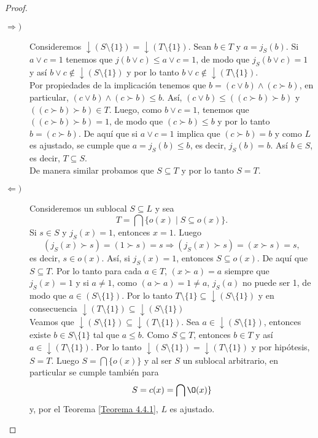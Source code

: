\documentclass{comunicaciones}
\begin{document}
\begin{proof}
\begin{description}
    \item[$\Rightarrow) $] Consideremos $\downarrow(S\setminus \{1\})=\downarrow(T\setminus \{1\})$. Sean $b\in T$ y $a=j_S(b)$. Si $a\vee c=1$ tenemos que $j(b\vee c)\leq a\vee c=1$, de modo que $j_S(b\vee c)=1$ y así $b\vee c\notin \downarrow(S\setminus \{1\})$ y por lo tanto $b\vee c\notin \downarrow (T\setminus \{1\})$.\\

    Por propiedades de la implicación tenemos que $b=(c\vee b)\wedge (c\succ b)$, en particular, $(c\vee b)\wedge (c\succ b)\leq b$. Así, $(c\vee b)\leq ((c\succ b)\succ b)$ y $((c\succ b)\succ b)\in T$. Luego, como $b\vee c=1$, tenemos que $((c\succ b)\succ b)=1$, de modo que $(c\succ b)\leq b$ y por lo tanto $b=(c\succ b)$. De aquí que si $a\vee c=1$ implica que $(c\succ b)=b$ y como $L$ es ajustado, se cumple que $a=j_S(b)\leq b$, es decir, $j_S(b)=b$. Así $b\in S$, es decir, $T\subseteq S$.\\

    De manera similar probamos que $S\subseteq T$ y por lo tanto $S=T$.

    \item[$\Leftarrow) $] Consideremos un sublocal $S\subseteq L$ y sea 
    \[
    T=\bigcap\{o(x)\mid S\subseteq o(x)\}.
    \]
    Si $s\in S$ y $j_S(x)=1$, entonces $x=1$. Luego
    \[
    (j_S(x)\succ s)=(1\succ s)=s\Rightarrow (j_S(x)\succ s)=(x\succ s)=s,
    \]
    es decir, $s\in o(x)$. Así, si $j_S(x)=1$, entonces $S\subseteq o(x)$. De aquí que $S\subseteq T$. Por lo tanto para cada $a\in T$, $(x\succ a)=a$ siempre que $j_S(x)=1$ y si $a\neq 1$, como $(a\succ a)=1\neq a$, $j_S(a)$ no puede ser 1, de modo que $a\in (S\setminus \{1\})$. Por lo tanto $T\setminus\{1\}\subseteq \downarrow (S\setminus \{1\})$ y en consecuencia $\downarrow(T\setminus \{1\})\subseteq \downarrow(S\setminus \{1\})$\\

    Veamos que $\downarrow (S\setminus \{1\})\subseteq \downarrow(T\setminus \{1\})$. Sea $a\in \downarrow(S\setminus \{1\})$, entonces existe $b\in S\setminus \{1\}$ tal que $a\leq b$. Como $S\subseteq T$, entonces $b\in T$ y así $a\in \downarrow(T\setminus \{1\})$. Por lo tanto $\downarrow(S\setminus \{1\})=\downarrow(T\setminus \{1\})$ y por hipótesis, $S=T$. Luego $S=\bigcap \{o(x)\}$ y al ser $S$ un sublocal arbitrario, en particular se cumple también para 
    \[
    S=c(x)=\bigcap\o(x)\}
    \]
    y, por el Teorema \ref{Teorema 4.4.1}, $L$ es ajustado.
\end{description}    
\end{proof}
\end{document}
